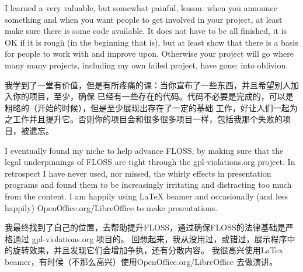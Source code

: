 I learned a very valuable, but somewhat painful, lesson: when you announce
something and when you want people to get involved in your project, at least
make sure there is some code available. It does not have to be all finished, it
is OK if it is rough (in the beginning that is), but at least show that there is
a basis for people to work with and improve upon. Otherwise your project will go
where many many projects, including my own failed project, have gone: into
oblivion.

我学到了一堂有价值，但是有所疼痛的课：当你宣布了一些东西，并且希望别人加入你的项目，至少，确保
已经有一些存在的代码。代码不必要是完成的，可以是粗略的（开始的时候），但是至少展现出存在了一定的基础
工作，好让人们一起为之工作并且提升它。否则你的项目会和很多很多项目一样，包括我那个失败的项目，被遗忘。


I eventually found my niche to help advance FLOSS, by making sure that the legal
underpinnings of FLOSS are tight through the gpl-violations.org project. In
retrospect I have never used, nor missed, the whirly effects in presentation
programs and found them to be increasingly irritating and distracting too much
from the content. I am happily using LaTeX beamer and occasionally (and less
happily) OpenOffice.org/LibreOffice to make presentations.

我最终找到了自己的位置，去帮助提升FLOSS，通过确保FLOSS的法律基础是严格通过 gpl-violations.org 项目的。
回想起来，我从没用过，或错过，展示程序中的旋转效果，并且发现它们会增加争执，还有分散内容。
我很高兴使用LaTex beamer，有时候（不那么高兴）使用OpenOffice.org/LibreOffice 去做演讲。
